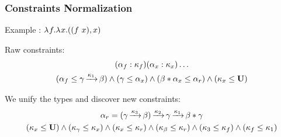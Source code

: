 \documentclass[xcolor=svgnames,11pt]{beamer}
\begin{document}



\begin{frame}
  \frametitle{Constraints \hfill Normalization}

  Example : $\lambda^{{}} f.{\lambda^{{}} x.{((f\ x),x)}}$

  Raw constraints:
  \begin{gather*}
    (\alpha_f : \kappa_f)
    (\alpha_x : \kappa_x)\dots\\
    (\alpha_f \leq \gamma \operatorname{\xrightarrow{\kappa_1}} \beta )
    \wedge
    (\gamma \leq \alpha_x)
    \wedge
    (\beta * \alpha_x \leq \alpha_r)
    \wedge
    (\kappa_x \leq \mathbf{U})
  \end{gather*}\pause

  We unify the types and discover new constraints:
  \begin{gather*}
    \alpha_r =
    (\gamma \operatorname{\xrightarrow{\kappa_3}} \beta) \operatorname{\xrightarrow{\kappa_2}} \gamma \operatorname{\xrightarrow{\kappa_1}} \beta * \gamma\\
    (\kappa_x \leq \mathbf{U})
    \wedge
    (\kappa_\gamma \leq \kappa_x)
    \wedge
    (\kappa_x \leq \kappa_r)
    \wedge
    (\kappa_\beta \leq \kappa_r)
    \wedge
    (\kappa_3 \leq \kappa_f)
    \wedge
    (\kappa_f \leq \kappa_1)
  \end{gather*}
\end{frame}
\end{document}
